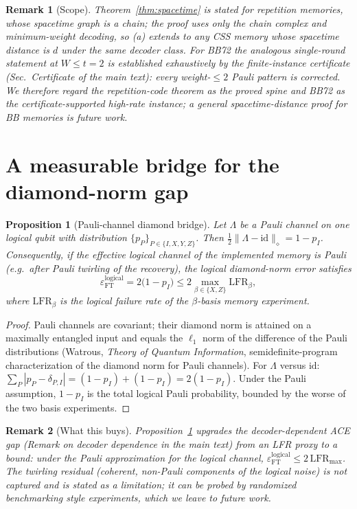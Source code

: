 \documentclass[10pt,twocolumn]{revtex4-2}
\newtheorem{proposition}{Proposition}
\newtheorem{remark}{Remark}
\begin{document}
\begin{remark}[Scope]
Theorem~\ref{thm:spacetime} is stated for repetition memories, whose
spacetime graph is a chain; the proof uses only the chain complex and
minimum-weight decoding, so (a) extends to any CSS memory whose
spacetime distance is $d$ under the same decoder class. For BB72 the
analogous single-round statement at $W\le t=2$ is established
\emph{exhaustively} by the finite-instance certificate
(Sec.~Certificate of the main text): every weight-$\le2$ Pauli pattern
is corrected. We therefore regard the repetition-code theorem as the
proved spine and BB72 as the certificate-supported high-rate instance;
a general spacetime-distance proof for BB memories is future work.
\end{remark}

\section{A measurable bridge for the diamond-norm gap}

\begin{proposition}[Pauli-channel diamond bridge]\label{prop:bridge}
Let $\Lambda$ be a Pauli channel on one logical qubit with distribution
$\{p_P\}_{P\in\{I,X,Y,Z\}}$. Then
$\tfrac12\|\Lambda-\mathrm{id}\|_\diamond = 1-p_I$.
Consequently, if the effective logical channel of the implemented
memory is Pauli (e.g.\ after Pauli twirling of the recovery), the
logical diamond-norm error satisfies
\[
\varepsilon_{\mathrm{FT}}^{\mathrm{logical}}
= 2\bigl(1-p_I\bigr)
\le 2\max_{\beta\in\{X,Z\}}\mathrm{LFR}_{\beta},
\]
where $\mathrm{LFR}_\beta$ is the logical failure rate of the
$\beta$-basis memory experiment.
\end{proposition}
\begin{proof}
Pauli channels are covariant; their diamond norm is attained on a
maximally entangled input and equals the $\ell_1$ norm of the
difference of the Pauli distributions (Watrous, \emph{Theory of Quantum
Information}, semidefinite-program characterization of the diamond norm
for Pauli channels). For $\Lambda$ versus $\mathrm{id}$:
$\sum_P|p_P-\delta_{P,I}|=(1-p_I)+(1-p_I)=2(1-p_I)$. Under the Pauli
assumption, $1-p_I$ is the total logical Pauli probability, bounded by
the worse of the two basis experiments.
\end{proof}

\begin{remark}[What this buys]
Proposition~\ref{prop:bridge} upgrades the decoder-dependent ACE gap
(Remark on decoder dependence in the main text) from an LFR
\emph{proxy} to a \emph{bound}: under the Pauli approximation for the
logical channel, $\varepsilon_{\mathrm{FT}}^{\mathrm{logical}}\le
2\,\mathrm{LFR}_{\max}$. The twirling residual (coherent,
non-Pauli components of the logical noise) is not captured and is
stated as a limitation; it can be probed by randomized benchmarking
style experiments, which we leave to future work.
\end{remark}
\end{document}
